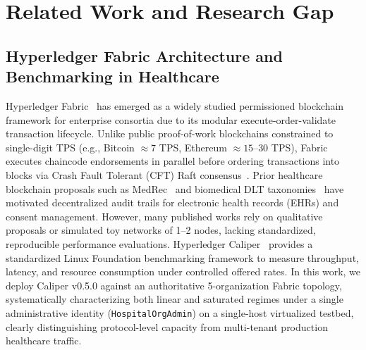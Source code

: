 \documentclass[runningheads]{llncs}
\begin{document}
\section{Related Work and Research Gap}

\subsection{Hyperledger Fabric Architecture and Benchmarking in Healthcare}
Hyperledger Fabric~\cite{androulaki2018hyperledger} has emerged as a widely studied permissioned blockchain framework for enterprise consortia due to its modular execute-order-validate transaction lifecycle. Unlike public proof-of-work blockchains constrained to single-digit TPS (e.g., Bitcoin $\approx 7$ TPS, Ethereum $\approx 15$--$30$ TPS), Fabric executes chaincode endorsements in parallel before ordering transactions into blocks via Crash Fault Tolerant (CFT) Raft consensus~\cite{androulaki2018hyperledger}. Prior healthcare blockchain proposals such as MedRec~\cite{azaria2016medrec} and biomedical DLT taxonomies~\cite{kuo2017blockchain} have motivated decentralized audit trails for electronic health records (EHRs) and consent management. However, many published works rely on qualitative proposals or simulated toy networks of 1--2 nodes, lacking standardized, reproducible performance evaluations. Hyperledger Caliper~\cite{caliper2022} provides a standardized Linux Foundation benchmarking framework to measure throughput, latency, and resource consumption under controlled offered rates. In this work, we deploy Caliper v0.5.0 against an authoritative 5-organization Fabric topology, systematically characterizing both linear and saturated regimes under a single administrative identity (\texttt{HospitalOrgAdmin}) on a single-host virtualized testbed, clearly distinguishing protocol-level capacity from multi-tenant production healthcare traffic.
\end{document}
